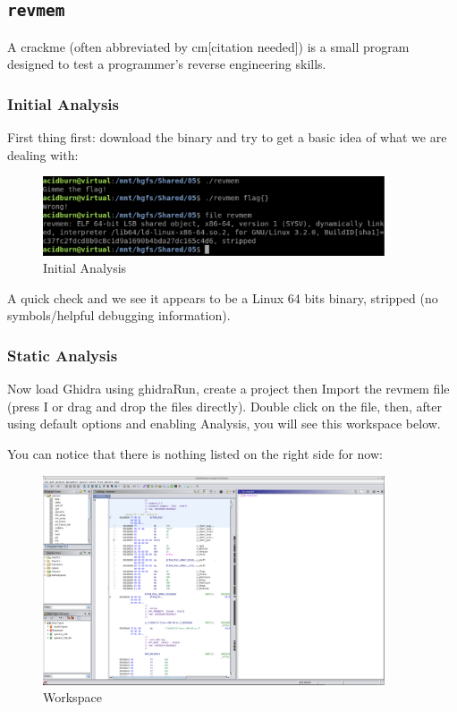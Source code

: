 \documentclass{article}
\begin{document}
\subsection{\texttt{revmem}}

A crackme (often abbreviated by cm[citation needed]) is a small program designed to test a programmer’s 
reverse engineering skills.

\subsubsection{Initial Analysis}

First thing first: download the binary and try to get a basic idea of what we are dealing with:
\begin{figure}[H]
\centering
\includegraphics[width=0.9\textwidth]{img/initial.jpg}
\caption{Initial Analysis}
\label{fig:initial}
\end{figure}
\noindent\linebreak
A quick check and we see it appears to be a Linux 64 bits binary, stripped (no symbols/helpful debugging information).

\subsubsection{Static Analysis}

\noindent\linebreak
Now load Ghidra using ghidraRun, create a project then Import the revmem file (press I or drag and drop the files 
directly). Double click on the file, then, after using default options and enabling Analysis, you will see this 
workspace below.

\noindent\linebreak
You can notice that there is nothing listed on the right side for now:
\begin{figure}[H]
\centering
\includegraphics[width=0.9\textwidth]{img/ghidra_1.jpg}
\caption{Workspace}
\label{fig:ghidra_1}
\end{figure}
\end{document}
